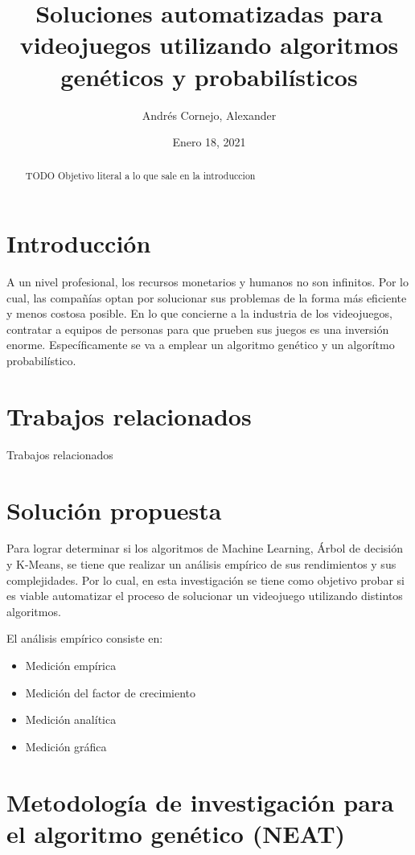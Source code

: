 \documentclass{article}
\author{Andrés Cornejo, Alexander} %
\date{Enero 18, 2021}
\title{Soluciones automatizadas para videojuegos utilizando algoritmos genéticos y probabilísticos}
\begin{document}
\maketitle

\begin{abstract}
  TODO
  Objetivo literal a lo que sale en la introduccion
\end{abstract}

\section{Introducción}
A un nivel profesional, los recursos monetarios y humanos no son infinitos. Por lo cual, las compañías optan por solucionar sus problemas de la forma más eficiente y menos costosa posible. En lo que concierne a la industria de los videojuegos, contratar a equipos de personas para que prueben sus juegos es una inversión enorme. Específicamente se va a emplear un algoritmo genético y un algorítmo probabilístico.

\section{Trabajos relacionados}

Trabajos relacionados

\section{Solución propuesta}
Para lograr determinar si los algoritmos de Machine Learning, Árbol de decisión y K-Means, se tiene que realizar un análisis empírico de sus rendimientos y sus complejidades. Por lo cual, en esta investigación se tiene como objetivo probar si es viable automatizar el proceso de solucionar un videojuego utilizando distintos algoritmos.

El análisis empírico consiste en:
\begin{itemize}
  \item Medición empírica
  \item Medición del factor de crecimiento
  \item Medición analítica
  \item Medición gráfica
\end{itemize}


\section{Metodología de investigación para el algoritmo genético (NEAT)}
\end{document}
